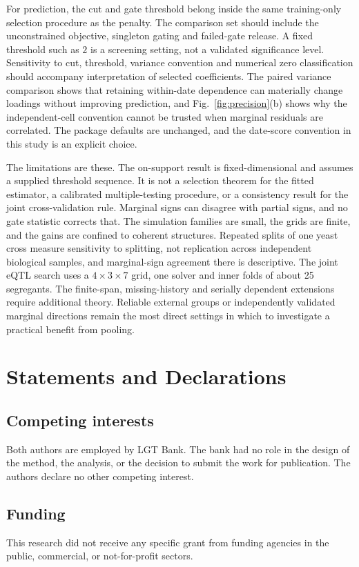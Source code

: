 \documentclass[lineno,pdflatex,sn-basic]{sn-jnl}
\theoremstyle{thmstyleone}
\begin{document}
For prediction, the cut and gate threshold belong inside the same training-only
selection procedure as the penalty. The comparison set should include the
unconstrained objective, singleton gating and failed-gate release. A fixed
threshold such as $2$ is a screening setting, not a validated significance level.
Sensitivity to cut, threshold, variance convention and numerical zero
classification should accompany interpretation of selected coefficients. The
paired variance comparison shows that retaining within-date dependence can
materially change loadings without improving prediction, and
Fig.~\ref{fig:precision}(b) shows why the independent-cell convention cannot
be trusted when marginal residuals are correlated. The package defaults are
unchanged, and the date-score convention in this study is an explicit choice.

The limitations are these. The on-support result is fixed-dimensional and
assumes a supplied threshold sequence. It is not a selection theorem for the
fitted estimator, a calibrated multiple-testing procedure, or a consistency
result for the joint cross-validation rule. Marginal signs can disagree with
partial signs, and no gate statistic corrects that. The simulation families
are small, the grids are finite, and the gains are confined to coherent
structures. Repeated splits of one yeast cross measure sensitivity to
splitting, not replication across independent biological samples, and
marginal-sign agreement there is descriptive. The joint eQTL search uses a
$4\times3\times7$ grid, one solver and inner folds of about 25 segregants. The
finite-span, missing-history and
serially dependent extensions require additional theory. Reliable external
groups or independently validated marginal directions remain the most direct
settings in which to investigate a practical benefit from pooling.

\section*{Statements and Declarations}
\subsection*{Competing interests}
Both authors are employed by LGT Bank. The bank had no role in the design of
the method, the analysis, or the decision to submit the work for publication.
The authors declare no other competing interest.
\subsection*{Funding}
This research did not receive any specific grant from funding agencies in
the public, commercial, or not-for-profit sectors.
\end{document}
